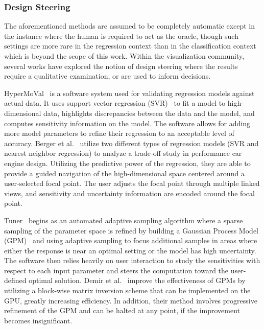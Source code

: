 
\subsubsection{Design Steering}

The aforementioned methods are assumed to be completely automatic except in the instance where the human is required to act as the oracle, though such settings are more rare in the regression context than in the classification context which is beyond the scope of this work.
%
Within the visualization community, several works have explored the notion of design steering where the results require a qualitative examination, or are used to inform decisions.

HyperMoVal~\cite{PiringerBergerKrasser2010} is a software system used for validating regression models against actual data.
%
It uses support vector regression (SVR)~\cite{SmolaScholkopf2004} to fit a model to high-dimensional data, highlights discrepancies between the data and the model, and computes sensitivity information on the model.
%
The software allows for adding more model parameters to refine their regression to an acceptable level of accuracy.
%
Berger et al.~\cite{BergerPiringerFilzmoser2011} utilize two different types of regression models (SVR and nearest neighbor regression) to analyze a trade-off study in performance car engine design.
%
Utilizing the predictive power of the regression, they are able to provide a guided navigation of the high-dimensional space centered around a user-selected focal point.
%
The user adjusts the focal point through multiple linked views, and sensitivity and uncertainty information are encoded around the focal point.

Tuner~\cite{Torsney-WeirSaadMoller2011} begins as an automated adaptive sampling algorithm where a sparse sampling of the parameter space is refined by building a Gaussian Process Model (GPM)~\cite{RasmussenWilliams2006} and using adaptive sampling to focus additional samples in areas where either the response is near an optimal setting or the model has high uncertainty.
%
The software then relies heavily on user interaction to study the sensitivities with respect to each input parameter and steers the computation toward the user-defined optimal solution.
%
Demir et al.~\cite{DemirWestermann2013} improve the effectiveness of GPMs by utilizing a block-wise matrix inversion scheme that can be implemented on the GPU, greatly increasing efficiency.
%
In addition, their method involves progressive refinement of the GPM and can be halted at any point, if the improvement becomes insignificant.


